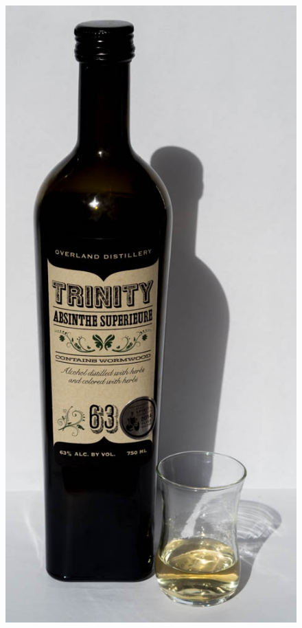 \documentclass[12pt,letterpaper,oneside]{memoir}
\begin{document}
  \begin{figure}
    \includegraphics[width=\linewidth]{../../assets/tasting/naa-trinity.jpg}
  \end{figure}
\end{document}
